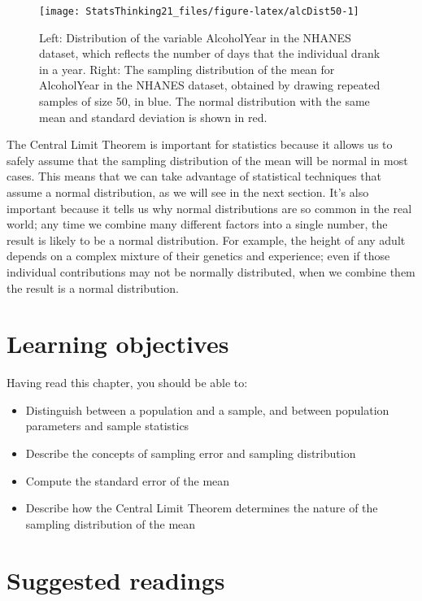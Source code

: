 \documentclass[
  12pt,
]{book}
\providecommand{\tightlist}{%
  \setlength{\itemsep}{0pt}\setlength{\parskip}{0pt}}
\begin{document}
\begin{figure}
\texttt{[image: StatsThinking21\_files/figure-latex/alcDist50-1]} \caption{Left: Distribution of the variable AlcoholYear in the NHANES dataset, which reflects the number of days that the individual drank in a year. Right: The sampling distribution of the mean for AlcoholYear in the NHANES dataset, obtained by drawing repeated samples of size 50, in blue.  The normal distribution with the same mean and standard deviation is shown in red.}\label{fig:alcDist50}
\end{figure}

The Central Limit Theorem is important for statistics because it allows us to safely assume that the sampling distribution of the mean will be normal in most cases. This means that we can take advantage of statistical techniques that assume a normal distribution, as we will see in the next section. It's also important because it tells us why normal distributions are so common in the real world; any time we combine many different factors into a single number, the result is likely to be a normal distribution. For example, the height of any adult depends on a complex mixture of their genetics and experience; even if those individual contributions may not be normally distributed, when we combine them the result is a normal distribution.

\hypertarget{learning-objectives-6}{%
\section{Learning objectives}\label{learning-objectives-6}}

Having read this chapter, you should be able to:

\begin{itemize}
\tightlist
\item
  Distinguish between a population and a sample, and between population parameters and sample statistics
\item
  Describe the concepts of sampling error and sampling distribution
\item
  Compute the standard error of the mean
\item
  Describe how the Central Limit Theorem determines the nature of the sampling distribution of the mean
\end{itemize}

\hypertarget{suggested-readings-4}{%
\section{Suggested readings}\label{suggested-readings-4}}
\end{document}
